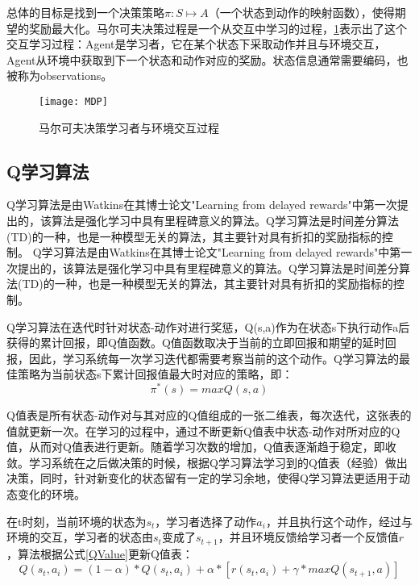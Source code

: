 总体的目标是找到一个决策策略$\pi :S\longmapsto A$（一个状态到动作的映射函数），使得期望的奖励最大化。马尔可夫决策过程是一个从交互中学习的过程，\ref{Interaction}表示出了这个交互学习过程：Agent是学习者，它在某个状态下采取动作并且与环境交互，Agent从环境中获取到下一个状态和动作对应的奖励。状态信息通常需要编码，也被称为observations。
\begin{figure}[h]
    \centering
    \texttt{[image: MDP]}
    \caption{马尔可夫决策学习者与环境交互过程}
    \label{Interaction}
\end{figure}

\subsection{Q学习算法}
Q学习算法\cite{QLearning2}是由Watkins在其博士论文"Learning from delayed rewards"\cite{QLearning0}中第一次提出的，该算法是强化学习中具有里程碑意义的算法。Q学习算法是时间差分算法(TD)\cite{QLearning1}的一种，也是一种模型无关的算法，其主要针对具有折扣的奖励指标的控制。
Q学习算法\cite{QLearning2}是由Watkins在其博士论文"Learning from delayed rewards"\cite{QLearning0}中第一次提出的，该算法是强化学习中具有里程碑意义的算法。Q学习算法是时间差分算法(TD)\cite{QLearning1}的一种，也是一种模型无关的算法，其主要针对具有折扣的奖励指标的控制。

Q学习算法在迭代时针对状态-动作对进行奖惩，Q(s,a)作为在状态s下执行动作a后获得的累计回报，即Q值函数。Q值函数取决于当前的立即回报和期望的延时回报，因此，学习系统每一次学习迭代都需要考察当前的这个动作。Q学习算法的最佳策略为当前状态s下累计回报值最大时对应的策略，即：
\begin{equation}
    \pi^*(s) = max Q(s,a)
\end{equation}

Q值表是所有状态-动作对与其对应的Q值组成的一张二维表，每次迭代，这张表的值就更新一次。在学习的过程中，通过不断更新Q值表中状态-动作对所对应的Q值，从而对Q值表进行更新。随着学习次数的增加，Q值表逐渐趋于稳定，即收敛。学习系统在之后做决策的时候，根据Q学习算法学习到的Q值表（经验）做出决策，同时，针对新变化的状态留有一定的学习余地，使得Q学习算法更适用于动态变化的环境。

在t时刻，当前环境的状态为$s_t$，学习者选择了动作$a_i$，并且执行这个动作，经过与环境的交互，学习者的状态由$s_t$变成了$s_{t+1}$，并且环境反馈给学习者一个反馈值$r$，算法根据公式\ref{QValue}\cite{RLIntroduction}更新Q值表：
\begin{equation}
    \label{QValue}
    Q(s_t,a_i)=(1-\alpha)*Q(s_t,a_i)+\alpha *[r(s_t,a_i)+\gamma *maxQ(s_{t+1},a)]
\end{equation}

